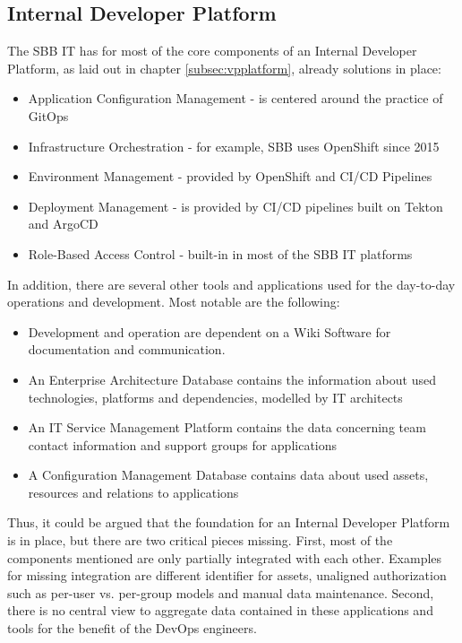 \documentclass[a4paper,12pt]{article}
\begin{document}
    \subsection{Internal Developer Platform}
    \label{subsec:sbbplatform}
    The SBB IT has for most of the core components of an Internal Developer Platform, as laid out in chapter \ref{subsec:vpplatform},
    already solutions in place:
    \begin{itemize}
        \item Application Configuration Management - is centered around the practice of GitOps\parencite{hashicorpvault}
        \item Infrastructure Orchestration - for example, SBB uses OpenShift since 2015\parencite{rhsbbopenshift}
        \item Environment Management - provided by OpenShift and CI/CD Pipelines
        \item Deployment Management - is provided by CI/CD pipelines built on Tekton and ArgoCD\parencite{sbbtekton}
        \item Role-Based Access Control - built-in in most of the SBB IT platforms
    \end{itemize}
    In addition, there are several other tools and applications used for the day-to-day operations and development.
    Most notable are the following:
    \begin{itemize}
        \item Development and operation are dependent on a Wiki Software for documentation and communication.
        \item An Enterprise Architecture Database contains the information about used technologies, platforms and
        dependencies, modelled by IT architects
        \item An IT Service Management Platform contains the data concerning team contact information and support groups for applications
        \item A Configuration Management Database contains data about used assets, resources and relations to applications
    \end{itemize}
    Thus, it could be argued that the foundation for an Internal Developer Platform is in place, but there are two
    critical pieces missing.
    First, most of the components mentioned are only partially integrated with each other.
    Examples for missing integration are different identifier for assets, unaligned authorization such as per-user vs.
    per-group models and manual data maintenance.
    Second, there is no central view to aggregate data contained in these applications and tools for the benefit of
    the DevOps engineers.
\end{document}
